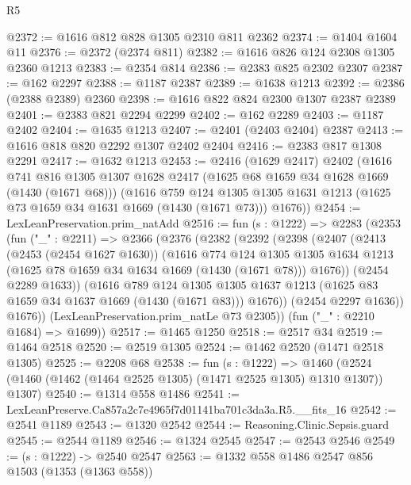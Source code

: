 \begin{lexlean}{R5}
\begin{coremodule}
@2372 := @1616 @812 @828 @1305 @2310 @811 @2362
@2374 := @1404 @1604 @11
@2376 := @2372 (@2374 @811)
@2382 := @1616 @826 @124 @2308 @1305 @2360 @1213
@2383 := @2354 @814
@2386 := @2383 @825 @2302 @2307
@2387 := @162 @2297
@2388 := @1187 @2387
@2389 := @1638 @1213
@2392 := @2386 (@2388 @2389) @2360
@2398 := @1616 @822 @824 @2300 @1307 @2387 @2389
@2401 := @2383 @821 @2294 @2299
@2402 := @162 @2289
@2403 := @1187 @2402
@2404 := @1635 @1213
@2407 := @2401 (@2403 @2404) @2387
@2413 := @1616 @818 @820 @2292 @1307 @2402 @2404
@2416 := @2383 @817 @1308 @2291
@2417 := @1632 @1213
@2453 := @2416
    (@1629 @2417)
    @2402
    (@1616
      @741
      @816
      @1305
      @1307
      @1628
      @2417
      (@1625 @68 @1659 @34 @1628 @1669 (@1430 (@1671 @68)))
      (@1616
        @759
        @124
        @1305
        @1305
        @1631
        @1213
        (@1625 @73 @1659 @34 @1631 @1669 (@1430 (@1671 @73)))
        @1676))
@2454 := LexLeanPreservation.prim_natAdd
@2516 := fun (s : @1222) =>
  @2283
    (@2353
      (fun ("_" : @2211) =>
      @2366
        (@2376
          (@2382
            (@2392
              (@2398
                (@2407
                  (@2413
                    (@2453 (@2454 @1627 @1630))
                    (@1616
                      @774
                      @124
                      @1305
                      @1305
                      @1634
                      @1213
                      (@1625 @78 @1659 @34 @1634 @1669 (@1430 (@1671 @78)))
                      @1676))
                  (@2454 @2289 @1633))
                (@1616
                  @789
                  @124
                  @1305
                  @1305
                  @1637
                  @1213
                  (@1625 @83 @1659 @34 @1637 @1669 (@1430 (@1671 @83)))
                  @1676))
              (@2454 @2297 @1636))
            @1676))
        (LexLeanPreservation.prim_natLe @73 @2305))
      (fun ("_" : @2210 @1684) => @1699))
@2517 := @1465 @1250
@2518 := @2517 @34
@2519 := @1464 @2518
@2520 := @2519 @1305
@2524 := @1462 @2520 (@1471 @2518 @1305)
@2525 := @2208 @68
@2538 := fun (s : @1222) =>
  @1460 (@2524 (@1460 (@1462 (@1464 @2525 @1305) (@1471 @2525 @1305) @1310 @1307)) @1307)
@2540 := @1314 @558 @1486
@2541 := LexLeanPreserve.Ca857a2c7e4965f7d01141ba701c3da3a.R5.__fits_16
@2542 := @2541 @1189
@2543 := @1320 @2542
@2544 := Reasoning.Clinic.Sepsis.guard
@2545 := @2544 @1189
@2546 := @1324 @2545
@2547 := @2543 @2546
@2549 := (s : @1222) -> @2540 @2547
@2563 := @1332
    @558
    @1486
    @2547
    @856
    @1503
    (@1353 (@1363 @558))

\end{coremodule}
\end{lexlean}
